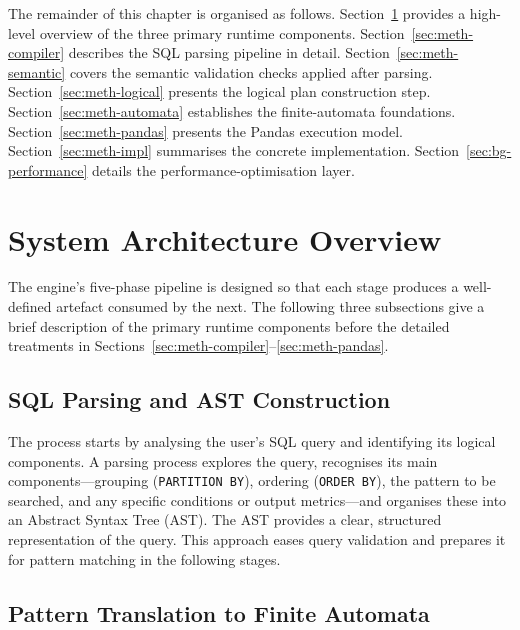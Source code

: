 The remainder of this chapter is organised as follows.
Section~\ref{sec:meth-overview} provides a high-level overview of
the three primary runtime components.
Section~\ref{sec:meth-compiler} describes the SQL parsing pipeline
in detail.
Section~\ref{sec:meth-semantic} covers the semantic validation
checks applied after parsing.
Section~\ref{sec:meth-logical} presents the logical plan
construction step.
Section~\ref{sec:meth-automata} establishes the finite-automata
foundations.
Section~\ref{sec:meth-pandas} presents the Pandas execution model.
Section~\ref{sec:meth-impl} summarises the concrete implementation.
Section~\ref{sec:bg-performance} details the
performance-optimisation layer.

\section{System Architecture Overview}
\label{sec:meth-overview}

The engine's five-phase pipeline is designed so that each stage
produces a well-defined artefact consumed by the next.
The following three subsections give a brief description of the
primary runtime components before the detailed treatments in
Sections~\ref{sec:meth-compiler}--\ref{sec:meth-pandas}.

\subsection{SQL Parsing and AST Construction}
\label{subsec:overview-parsing}

The process starts by analysing the user's SQL query and identifying
its logical components.  A parsing process explores the query,
recognises its main components---grouping (\texttt{PARTITION BY}),
ordering (\texttt{ORDER BY}), the pattern to be searched, and any
specific conditions or output metrics---and organises these into an
Abstract Syntax Tree (AST).  The AST provides a clear, structured
representation of the query.  This approach eases query validation
and prepares it for pattern matching in the following stages.

\subsection{Pattern Translation to Finite Automata}
\label{subsec:overview-automata}

